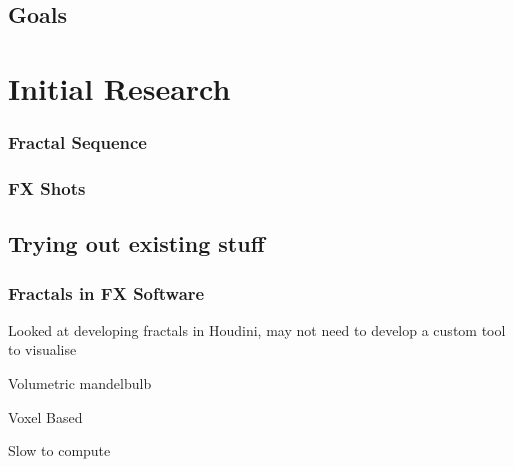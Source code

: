 \documentclass[11pt,a4paper,final,notitlepage]{report}
\begin{document}
\section{Goals}

\chapter{Initial Research}

\subsection{Fractal Sequence}
\subsection{FX Shots}

\section{Trying out existing stuff}
\subsection{Fractals in FX Software}
Looked at developing fractals in Houdini, may not need to develop a custom tool to visualise

Volumetric mandelbulb

Voxel Based

Slow to compute

%
%
%
%    
%    
%                         
%    
%   
%    
%   
%
\end{document}

